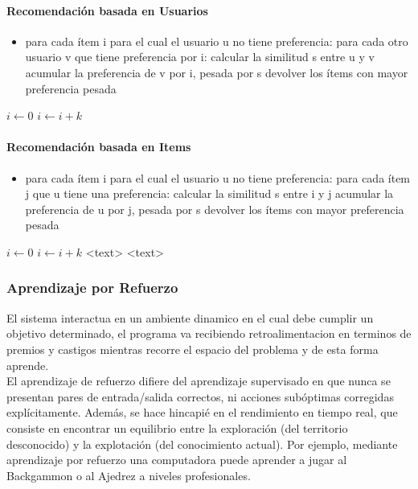 \documentclass[a4paper,11pt,spanish]{book}
\begin{document}
	\paragraph {Recomendación basada en Usuarios}
	  \begin{itemize}
	    \item para cada ítem i para el cual el usuario u no tiene preferencia:
	      \subitem para cada otro usuario v que tiene preferencia por i:
		\subsubitem calcular la similitud s entre u y v
		\subsubitem acumular la preferencia de v por i, pesada por s
		\subsubitem devolver los ítems con mayor preferencia pesada
	  \end{itemize}
	  \begin{algorithmic}
		\State $i\gets 0$
	    \Else
		    \State $i\gets i+k$
		\EndIf
	    \EndIf
	  \end{algorithmic}
	\paragraph {Recomendación basada en Items}
	  \begin{itemize}
	    \item para cada ítem i para el cual el usuario u no tiene preferencia:
	      \subitem para cada ítem j que u tiene una preferencia:
		\subsubitem calcular la similitud s entre i y j
		\subsubitem acumular la preferencia de u por j, pesada por s
		\subsubitem devolver los ítems con mayor preferencia pesada
	  \end{itemize}
	  \begin{algorithmic}
	    \If {$i\geq maxval$}
		\State $i\gets 0$
	    \Else
		\If {$i+k\leq maxval$}
		    \State $i\gets i+k$
		\EndIf
	    \EndIf
	     <text> \EndFor
	     <text> \EndFor
	  \end{algorithmic}
	  
      \subsubsection{Aprendizaje por Refuerzo}
	El sistema interactua en un ambiente dinamico en el cual debe cumplir un objetivo determinado, el programa va recibiendo retroalimentacion en terminos de premios y castigos mientras 
	recorre el espacio del problema y de esta forma aprende.\\
	El aprendizaje de refuerzo difiere del aprendizaje supervisado en que nunca se presentan pares de entrada/salida correctos, ni acciones subóptimas corregidas explícitamente. 
	Además, se hace hincapié en el rendimiento en tiempo real, que consiste en encontrar un equilibrio entre la exploración (del territorio desconocido) y la explotación 
	(del conocimiento actual).
	Por ejemplo, mediante aprendizaje por refuerzo una computadora puede aprender a jugar al Backgammon o al Ajedrez a niveles profesionales.
\end{document}
